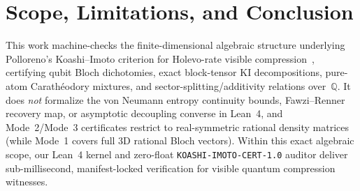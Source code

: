 \documentclass[11pt,twocolumn]{article}
\newcommand{\QQ}{\mathbb{Q}}
\begin{document}
\section{Scope, Limitations, and Conclusion}\label{sec:conclusion}
This work machine-checks the finite-dimensional algebraic structure underlying Polloreno's Koashi--Imoto criterion for Holevo-rate visible compression~\cite{polloreno2026koashi}, certifying qubit Bloch dichotomies, exact block-tensor KI decompositions, pure-atom Carath\'eodory mixtures, and sector-splitting/additivity relations over~$\QQ$. It does \emph{not} formalize the von Neumann entropy continuity bounds, Fawzi--Renner recovery map, or asymptotic decoupling converse in Lean~4, and Mode~2/Mode~3 certificates restrict to real-symmetric rational density matrices (while Mode~1 covers full 3D rational Bloch vectors). Within this exact algebraic scope, our Lean~4 kernel and zero-float \texttt{KOASHI-IMOTO-CERT-1.0} auditor deliver sub-millisecond, manifest-locked verification for visible quantum compression witnesses.



\end{document}
